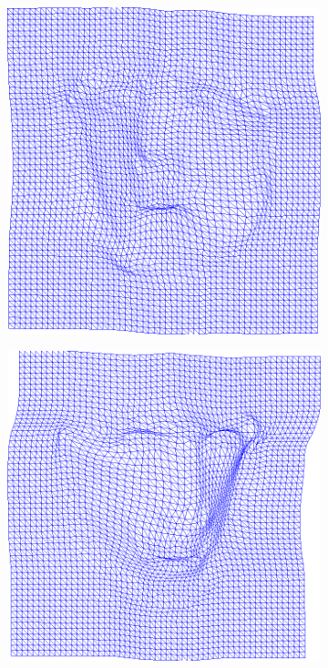 \begin{figure}[h]
    \centering
    \begin{subfigure}[b]{0.15\textwidth}
            \includegraphics[width=\textwidth]{resources/Fig_Flows/0}
    \end{subfigure}
    \hfill
    \begin{subfigure}[b]{0.15\textwidth}
            \includegraphics[width=\textwidth]{resources/Fig_Flows/1}

\end{subfigure}
\end{figure}
